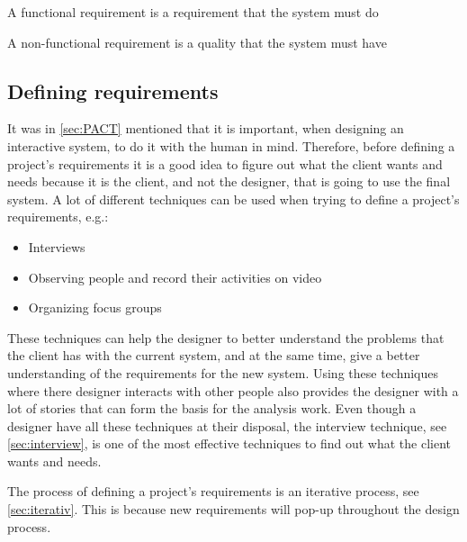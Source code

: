 \begin{defn}
    A functional requirement is a requirement that the system must do
\end{defn}

\begin{defn}
    A non-functional requirement is a quality that the system must have
\end{defn}

\subsection{Defining requirements} \label{sec:requirementsdefinition}
It was in \cref{sec:PACT} mentioned that it is important, when designing an interactive system, to do it with the human in mind.
Therefore, before defining a project's requirements it is a good idea to figure out what the client wants and needs because it is the client, and not the designer, that is going to use the final system.
A lot of different techniques can be used when trying to define a project's requirements, e.g.:

\begin{itemize}
    \item Interviews
    \item Observing people and record their activities on video
    \item Organizing focus groups
\end{itemize}

These techniques can help the designer to better understand the problems that the client has with the current system, and at the same time, give a better understanding of the requirements for the new system.
Using these techniques where there designer interacts with other people also provides the designer with a lot of stories that can form the basis for the analysis work. Even though a designer have all these techniques at their disposal, the interview technique, see \cref{sec:interview}, is one of the most effective techniques to find out what the client wants and needs.

The process of defining a project's requirements is an iterative process, see \cref{sec:iterativ}. This is because new requirements will pop-up throughout the design process.

